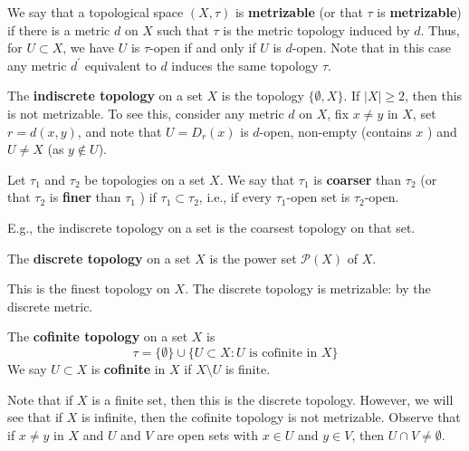 \documentclass[a4paper,11pt]{article}
\begin{document}
\begin{definition}
We say that a topological space $(X, \tau)$ is \textbf{metrizable} (or that $\tau$ is \textbf{metrizable}) if there is a metric $d$ on $X$ such that $\tau$ is the metric topology induced by $d$.
Thus, for $U \subset X$, we have $U$ is $\tau$-open if and only if $U$ is $d$-open. Note that in this case any metric $d^{\prime}$ equivalent to $d$ induces the same topology $\tau$.
\end{definition}

\begin{example}
    The \textbf{indiscrete topology} on a set $X$ is the topology $\{\emptyset, X\}$.
    If $|X| \geqslant 2$, then this is not metrizable. To see this, consider any metric $d$ on $X$, fix $x \neq y$ in $X$, set $r=d(x, y)$, and note that $U=D_r(x)$ is $d$-open, non-empty (contains $x$ ) and $U \neq X$ (as $y \notin U$).
\end{example}

\begin{definition}
    Let $\tau_1$ and $\tau_2$ be topologies on a set $X$. We say that $\tau_1$ is \textbf{coarser} than $\tau_2$ (or that $\tau_2$ is \textbf{finer} than $\tau_1$ ) if $\tau_1 \subset \tau_2$, i.e., if every $\tau_1$-open set is $\tau_2$-open.
\end{definition}
E.g., the indiscrete topology on a set is the coarsest topology on that set.

\begin{example}
    The \textbf{discrete topology} on a set $X$ is the power set $\mathcal{P}(X)$ of $X$.

    This is the finest topology on $X$. The discrete topology is metrizable: by the discrete metric.
\end{example}

\begin{example}
    The \textbf{cofinite topology} on a set $X$ is
    \[
    \tau=\{\emptyset\} \cup\{U \subset X: U \text { is cofinite in } X\}
    \]
    We say $U \subset X$ is \textbf{cofinite} in $X$ if $X \setminus U$ is finite.
    
    Note that if $X$ is a finite set, then this is the discrete topology.
    However, we will see that if $X$ is infinite, then the cofinite topology is not metrizable. Observe that if $x \neq y$ in $X$ and $U$ and $V$ are open sets with $x \in U$ and $y \in V$, then $U \cap V \neq \emptyset$.
\end{example}
\end{document}
